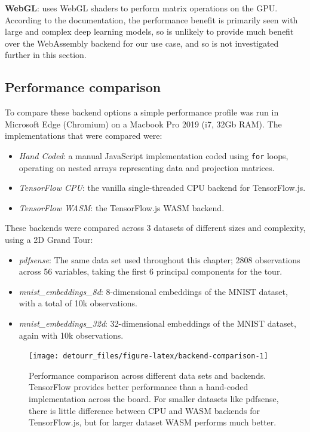 \textbf{WebGL}: uses WebGL shaders to perform matrix operations on the GPU. According to the documentation, the performance benefit is primarily seen with large and complex deep learning models, so is unlikely to provide much benefit over the WebAssembly backend for our use case, and so is not investigated further in this section.

\hypertarget{performance-comparison}{%
\subsection{Performance comparison}\label{performance-comparison}}

To compare these backend options a simple performance profile was run in Microsoft Edge (Chromium) on a Macbook Pro 2019 (i7, 32Gb RAM). The implementations that were compared were:

\begin{itemize}
\tightlist
\item
  \emph{Hand Coded}: a manual JavaScript implementation coded using \texttt{for} loops, operating on nested arrays representing data and projection matrices.
\item
  \emph{TensorFlow CPU}: the vanilla single-threaded CPU backend for TensorFlow.js.
\item
  \emph{TensorFlow WASM}: the TensorFlow.js WASM backend.
\end{itemize}

These backends were compared across 3 datasets of different sizes and complexity, using a 2D Grand Tour:

\begin{itemize}
\tightlist
\item
  \emph{pdfsense}: The same data set used throughout this chapter; 2808 observations across 56 variables, taking the first 6 principal components for the tour.
\item
  \emph{mnist\_embeddings\_8d}: 8-dimensional embeddings of the MNIST dataset, with a total of 10k observations.
\item
  \emph{mnist\_embeddings\_32d}: 32-dimensional embeddings of the MNIST dataset, again with 10k observations.
\end{itemize}

\begin{figure}
\texttt{[image: detourr\_files/figure-latex/backend-comparison-1]} \caption{Performance comparison across different data sets and backends. TensorFlow provides better performance than a hand-coded implementation across the board. For smaller datasets like pdfsense, there is little difference between CPU and WASM backends for TensorFlow.js, but for larger dataset WASM performs much better.}\label{fig:backend-comparison}
\end{figure}


